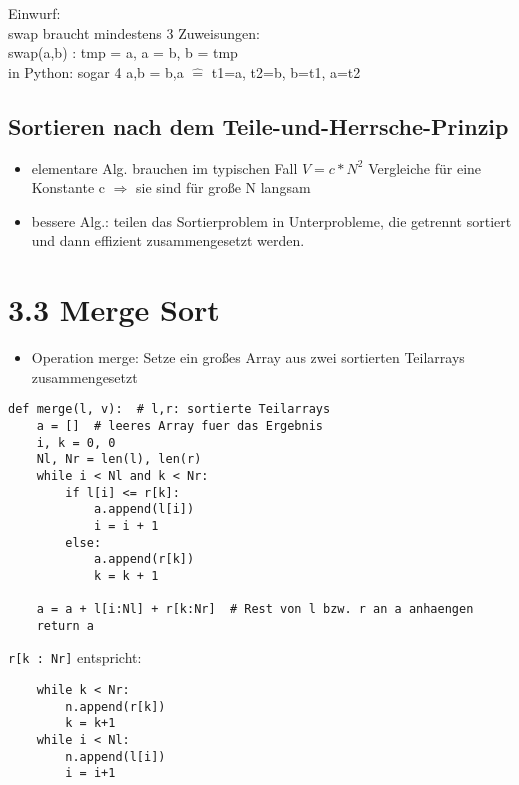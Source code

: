     Einwurf: \\
    swap braucht mindestens 3 Zuweisungen: \\
    \hspace*{5mm} swap(a,b) : tmp = a, a = b, b = tmp \\
    in Python: sogar 4 a,b = b,a $\widehat{=}$ t1=a, t2=b, b=t1, a=t2


    \subsection*{Sortieren nach dem Teile-und-Herrsche-Prinzip}

    \begin{itemize}
        \item elementare Alg. brauchen im typischen Fall $V= c * N^2$ Vergleiche für eine Konstante c $\Rightarrow$ sie sind für große N langsam
        \item bessere Alg.: teilen das Sortierproblem in Unterprobleme, die getrennt sortiert und dann effizient zusammengesetzt werden.

    \end{itemize}

    \section*{3.3 Merge Sort}

    \begin{itemize}
        \item Operation merge: Setze ein großes Array aus zwei sortierten Teilarrays zusammengesetzt
    \end{itemize}

    \begin{verbatim}
def merge(l, v):  # l,r: sortierte Teilarrays
    a = []  # leeres Array fuer das Ergebnis
    i, k = 0, 0
    Nl, Nr = len(l), len(r)
    while i < Nl and k < Nr:
        if l[i] <= r[k]:
            a.append(l[i])
            i = i + 1
        else:
            a.append(r[k])
            k = k + 1

    a = a + l[i:Nl] + r[k:Nr]  # Rest von l bzw. r an a anhaengen
    return a
    \end{verbatim}


    \verb|r[k : Nr]| entspricht: \\
    \begin{verbatim}
    while k < Nr:
        n.append(r[k])
        k = k+1
    while i < Nl:
        n.append(l[i])
        i = i+1
    \end{verbatim}


